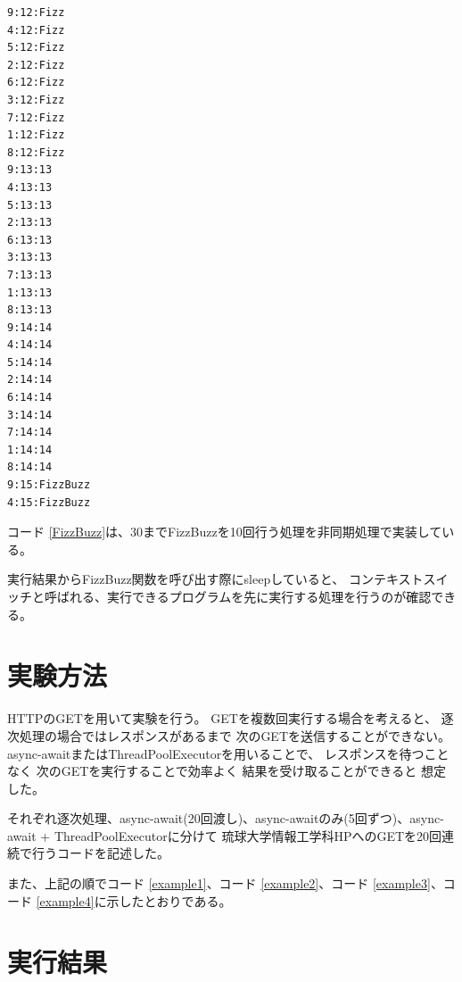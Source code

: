 \documentclass[14pt, oneside]{article}     	%
\begin{document}


\begin{lstlisting}[caption=FizzBuzz実行結果]
9:12:Fizz
4:12:Fizz
5:12:Fizz
2:12:Fizz
6:12:Fizz
3:12:Fizz
7:12:Fizz
1:12:Fizz
8:12:Fizz
9:13:13
4:13:13
5:13:13
2:13:13
6:13:13
3:13:13
7:13:13
1:13:13
8:13:13
9:14:14
4:14:14
5:14:14
2:14:14
6:14:14
3:14:14
7:14:14
1:14:14
8:14:14
9:15:FizzBuzz
4:15:FizzBuzz
\end{lstlisting}

コード \ref{FizzBuzz}は、30までFizzBuzzを10回行う処理を非同期処理で実装している。

実行結果からFizzBuzz関数を呼び出す際にsleepしていると、
コンテキストスイッチと呼ばれる、実行できるプログラムを先に実行する処理を行うのが確認できる。


\section{実験方法}

HTTPのGETを用いて実験を行う。
GETを複数回実行する場合を考えると、
逐次処理の場合ではレスポンスがあるまで
次のGETを送信することができない。
async-awaitまたはThreadPoolExecutorを用いることで、
レスポンスを待つことなく
次のGETを実行することで効率よく
結果を受け取ることができると
想定した。

それぞれ逐次処理、async-await(20回渡し)、async-awaitのみ(5回ずつ)、async-await + ThreadPoolExecutorに分けて
琉球大学情報工学科HPへのGETを20回連続で行うコードを記述した。

また、上記の順でコード \ref{example1}、コード \ref{example2}、コード \ref{example3}、コード \ref{example4}に示したとおりである。






\newpage





\newpage

\section{実行結果}
\end{document}
